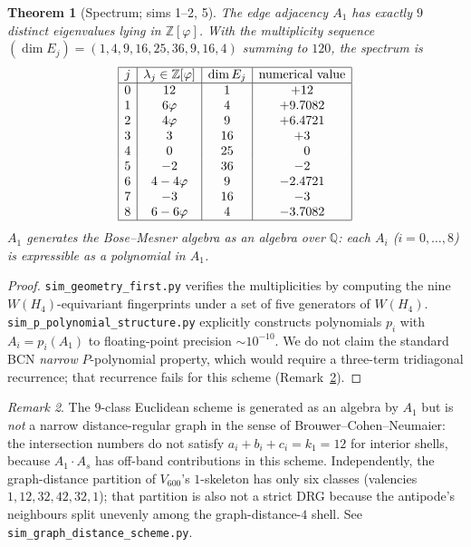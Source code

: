 \documentclass[11pt,a4paper]{article}
\newtheorem{theorem}{Theorem}
\theoremstyle{definition}
\theoremstyle{remark}
\newtheorem{remark}[theorem]{Remark}
\newcommand{\Z}{\mathbb{Z}}
\newcommand{\Q}{\mathbb{Q}}
\newcommand{\Zphi}{\Z[\varphi]}
\newcommand{\WHfour}{W(H_4)}
\begin{document}
\begin{theorem}[Spectrum; sims 1--2, 5]\label{thm:spectrum}
The edge adjacency $A_1$ has exactly $9$ distinct eigenvalues lying in
$\Zphi$. With the multiplicity sequence
$(\dim E_j) = (1,4,9,16,25,36,9,16,4)$ summing to $120$, the spectrum is
\[
\begin{array}{|c|c|c|c|}
\hline
j & \lambda_j \in \Zphi & \dim E_j & \text{numerical value} \\
\hline
0 & 12          & 1   & +12 \\
1 & 6\varphi    & 4   & +9.7082 \\
2 & 4\varphi    & 9   & +6.4721 \\
3 & 3           & 16  & +3 \\
4 & 0           & 25  & \phantom{+}0 \\
5 & -2          & 36  & -2 \\
6 & 4-4\varphi  & 9   & -2.4721 \\
7 & -3          & 16  & -3 \\
8 & 6-6\varphi  & 4   & -3.7082 \\
\hline
\end{array}
\]
$A_1$ generates the Bose--Mesner algebra as an algebra over $\Q$:
each $A_i$ ($i = 0, \dots, 8$) is expressible as a polynomial in $A_1$.
\end{theorem}

\begin{proof}
\texttt{sim\_geometry\_first.py} verifies the multiplicities by computing
the nine $\WHfour$-equivariant fingerprints under a set of five generators
of $\WHfour$. \texttt{sim\_p\_polynomial\_structure.py} explicitly
constructs polynomials $p_i$ with $A_i = p_i(A_1)$ to floating-point
precision $\sim 10^{-10}$. We do not claim the standard BCN \emph{narrow}
$P$-polynomial property, which would require a three-term tridiagonal
recurrence; that recurrence fails for this scheme
(Remark~\ref{rem:not-narrow-DRG}).
\end{proof}

\begin{remark}\label{rem:not-narrow-DRG}
The $9$-class Euclidean scheme is generated as an algebra by $A_1$ but is
\emph{not} a narrow distance-regular graph in the sense of
Brouwer--Cohen--Neumaier: the intersection numbers do not satisfy
$a_i + b_i + c_i = k_1 = 12$ for interior shells, because $A_1 \cdot A_s$
has off-band contributions in this scheme.
Independently, the graph-distance partition of $V_{600}$'s $1$-skeleton has
only six classes (valencies $1,12,32,42,32,1$); that partition is also not a
strict DRG because the antipode's neighbours split unevenly among the
graph-distance-$4$ shell. See \texttt{sim\_graph\_distance\_scheme.py}.
\end{remark}
\end{document}
